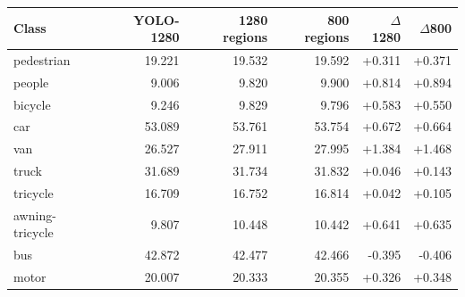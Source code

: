 \begin{tabular}{lrrrrr}
\toprule
Class & YOLO-1280 & 1280 regions & 800 regions & $\Delta$1280 & $\Delta$800\\
\midrule
pedestrian & 19.221 & 19.532 & 19.592 & +0.311 & +0.371\\
people & 9.006 & 9.820 & 9.900 & +0.814 & +0.894\\
bicycle & 9.246 & 9.829 & 9.796 & +0.583 & +0.550\\
car & 53.089 & 53.761 & 53.754 & +0.672 & +0.664\\
van & 26.527 & 27.911 & 27.995 & +1.384 & +1.468\\
truck & 31.689 & 31.734 & 31.832 & +0.046 & +0.143\\
tricycle & 16.709 & 16.752 & 16.814 & +0.042 & +0.105\\
awning-tricycle & 9.807 & 10.448 & 10.442 & +0.641 & +0.635\\
bus & 42.872 & 42.477 & 42.466 & -0.395 & -0.406\\
motor & 20.007 & 20.333 & 20.355 & +0.326 & +0.348\\
\bottomrule
\end{tabular}
